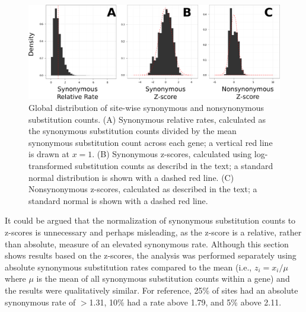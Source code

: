 \begin{figure}
\centering
\includegraphics[scale=0.4]{Figs/zscore_histograms.pdf}
\caption{Global distribution of site-wise synonymous and nonsynonymous
  substitution counts. (A) Synonymous relative rates, calculated as
  the synonymous substitution counts divided by the mean synonymous
  substitution count across each gene; a vertical red line is drawn at
  $x=1$. (B) Synonymous z-scores, calculated using log-transformed
  substitution counts as describd in the text; a standard normal
  distribution is shown with a dashed red line. (C) Nonsynonymous
  z-scores, calculated as described in the text; a standard normal is
  shown with a dashed red line.}
\label{fig_zscore_histogram}
\end{figure}


It could be argued that the normalization of synonymous substitution
counts to z-scores is unnecessary and perhaps misleading, as the
z-score is a relative, rather than absolute, measure of an elevated
synonymous rate. Although this section shows results based on the
z-scores, the analysis was performed separately using absolute
synonymous substitution rates compared to the mean (i.e., $z_{i} =
x_{i} / \mu$ where $\mu$ is the mean of all synonymous substitution
counts within a gene) and the results were qualitatively similar. For
reference, 25\% of sites had an absolute synonymous rate of $>$1.31,
10\% had a rate above 1.79, and 5\% above 2.11.

